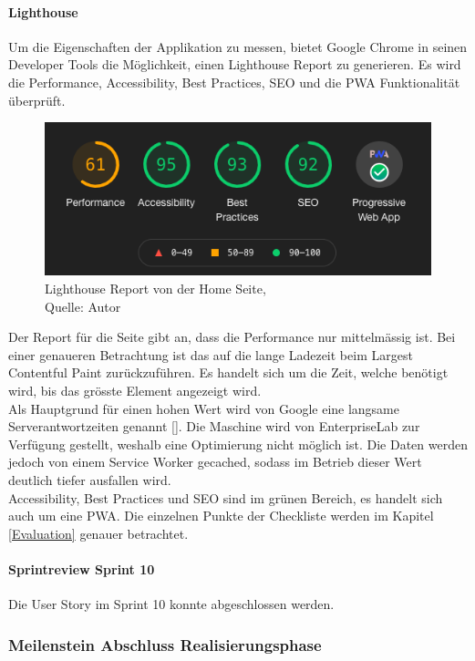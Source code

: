 \paragraph{Lighthouse}
Um die Eigenschaften der Applikation zu messen, bietet Google Chrome in seinen Developer Tools die Möglichkeit, einen Lighthouse Report zu generieren. Es wird die Performance, Accessibility, Best Practices, \ac{SEO} und die \gls{PWA} Funktionalität überprüft. 
\begin{figure}[H]
	\centering
	\includegraphics[scale=0.4]{images/lighthouseReport.png}
	\caption[Lighthouse Report von der Home Seite]{Lighthouse Report von der Home Seite,\\ Quelle: Autor}
	\label{img: lighthouseReport}
\end{figure} 
Der Report für die Seite gibt an, dass die Performance nur mittelmässig ist. Bei einer genaueren Betrachtung ist das auf die lange Ladezeit beim Largest Contentful Paint zurückzuführen. Es handelt sich um die Zeit, welche benötigt wird, bis das grösste Element angezeigt wird. \\
Als Hauptgrund für einen hohen Wert wird von Google eine langsame Serverantwortzeiten genannt [\cite{lcp}]. Die Maschine wird von \gls{EnterpriseLab} zur Verfügung gestellt, weshalb eine Optimierung nicht möglich ist. Die Daten werden jedoch von einem Service Worker gecached, sodass im Betrieb dieser Wert deutlich tiefer ausfallen wird.\\
Accessibility, Best Practices und \ac{SEO} sind im grünen Bereich, es handelt sich auch um eine \gls{PWA}. 
Die einzelnen Punkte der Checkliste werden im Kapitel \ref{Evaluation} genauer betrachtet. 
\paragraph{Sprintreview Sprint 10}
Die \gls{User Story} im Sprint 10 konnte abgeschlossen werden. 

\subsubsection{Meilenstein Abschluss Realisierungsphase}
